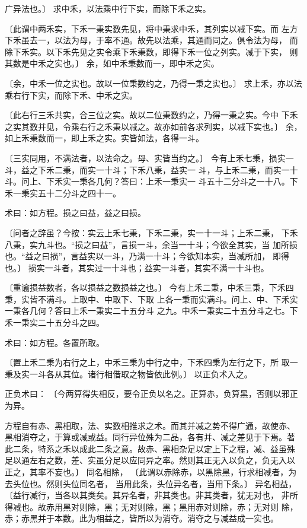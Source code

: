 \documentclass[12pt,UTF8]{ctexbook}
\begin{document}
广异法也。〕 求中禾，以法乘中行下实，而除下禾之实。

〔此谓中两禾实，下禾一秉实数先见，将中秉求中禾，其列实以减下实。而 左方下禾虽去一，以法为母，于率不通。故先以法乘，其通而同之。俱令法为母， 而除下禾实。以下禾先见之实令乘下禾秉数，即得下禾一位之列实。减于下实， 则其数是中禾之实也。〕 余，如中禾秉数而一，即中禾之实。

〔余，中禾一位之实也。故以一位秉数约之，乃得一秉之实也。〕 求上禾，亦以法乘右行下实，而除下禾、中禾之实。

〔此右行三禾共实，合三位之实。故以二位秉数约之，乃得一秉之实。今中 下禾之实其数并见，令乘右行之禾秉以减之。故亦如前各求列实，以减下实也。〕 余，如上禾秉数而一，即上禾之实。实皆如法，各得一斗。

〔三实同用，不满法者，以法命之。母、实皆当约之。〕 今有上禾七秉，损实一斗，益之下禾二秉，而实一十斗；下禾八秉，益实一 斗，与上禾二秉，而实一十斗。问上、下禾实一秉各几何？答曰：上禾一秉实一 斗五十二分斗之一十八。下禾一秉实五十二分斗之四十一。

术曰：如方程。损之曰益，益之曰损。

〔问者之辞虽？今按：实云上禾七秉，下禾二秉，实一十一斗；上禾二秉， 下禾八秉，实九斗也。“损之曰益”，言损一斗，余当一十斗；今欲全其实，当 加所损也。“益之曰损”，言益实以一斗，乃满一十斗；今欲知本实，当减所加， 即得也。〕 损实一斗者，其实过一十斗也；益实一斗者，其实不满一十斗也。

〔重谕损益数者，各以损益之数损益之也。〕 今有上禾二秉，中禾三秉，下禾四秉，实皆不满斗。上取中、中取下、下取 上各一秉而实满斗。问上、中、下禾实一秉各几何？答曰上禾一秉实二十五分斗 之九。中禾一秉实二十五分斗之七。下禾一秉实二十五分斗之四。

术曰：如方程。各置所取。

〔置上禾二秉为右行之上，中禾三秉为中行之中，下禾四秉为左行之下，所 取一秉及实一斗各从其位。诸行相借取之物皆依此例。〕 以正负术入之。

正负术曰： 〔今两算得失相反，要令正负以名之。正算赤，负算黑，否则以邪正为异。

方程自有赤、黑相取，法、实数相推求之术。而其并减之势不得广通，故使赤、 黑相消夺之，于算或减或益。同行异位殊为二品，各有并、减之差见于下焉。著 此二条，特系之禾以成此二条之意。故赤、黑相杂足以定上下之程，减、益虽殊 足以通左右之数，差、实虽分足以应同异之率。然则其正无入以负之，负无入以 正之，其率不妄也。〕 同名相除， 〔此谓以赤除赤，以黑除黑，行求相减者，为去头位也。然则头位同名者， 当用此条，头位异名者，当用下条。〕 异名相益， 〔益行减行，当各以其类矣。其异名者，非其类也。非其类者，犹无对也， 非所得减也。故赤用黑对则除，黑；无对则除，黑；黑用赤对则除，赤；无对则 除，赤；赤黑并于本数。此为相益之，皆所以为消夺。消夺之与减益成一实也。
\end{document}
